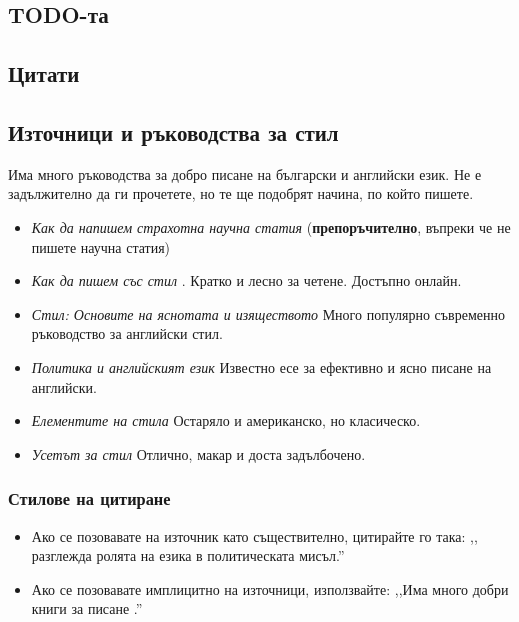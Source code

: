 \subsection{TODO-та}


\subsection{Цитати}


\subsection{Източници и ръководства за стил}
Има много ръководства за добро писане на български и английски език. Не е
задължително да ги прочетете, но те ще подобрят начина, по който пишете.

\begin{itemize}
    \item
    \emph{Как да напишем страхотна научна статия} \cite{Pey17} (\textbf{препоръчително}, въпреки че не пишете научна статия)
    \item
    \emph{Как да пишем със стил} \cite{Von80}. Кратко и лесно за четене. Достъпно онлайн.
    \item
    \emph{Стил: Основите на яснотата и изяществото} \cite{Wil09} Много популярно съвременно ръководство за английски стил.
    \item
    \emph{Политика и английският език} \cite{Orw68} Известно есе за ефективно и ясно писане на английски.
    \item
    \emph{Елементите на стила} \cite{StrWhi07} Остаряло и американско, но класическо.
    \item
    \emph{Усетът за стил} \cite{Pin15} Отлично, макар и доста задълбочено.
\end{itemize}

\subsubsection{Стилове на цитиране}

\begin{itemize}
\item Ако се позовавате на източник като съществително, цитирайте го така: ,,\citet{Orw68} разглежда ролята на езика в политическата мисъл.''
\item Ако се позовавате имплицитно на източници, използвайте: ,,Има много добри книги за писане \citep{Orw68, Wil09, Pin15}.''
\end{itemize}


